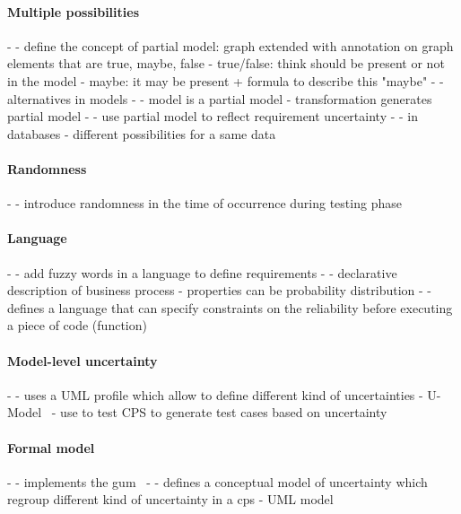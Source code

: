 \paragraph{Multiple possibilities}
- \cite{DBLP:conf/icse/FamelisSC12}
	- define the concept of partial model: graph extended with annotation on graph elements that are true, maybe, false
		- true/false: think should be present or not in the model
		- maybe: it may be present + formula to describe this "maybe"
- \cite{DBLP:journals/sosym/FamelisC19}
	- alternatives in models
- \cite{DBLP:conf/sle/EramoPR15, DBLP:conf/icse/EramoPR14}
	- model is a partial model
	- transformation generates partial model
- \cite{DBLP:journals/re/SalayCHS13}
	- use partial model to reflect requirement uncertainty
- \cite{DBLP:conf/vldb/BenjellounSHW06}	
	- in databases
	- different possibilities for a same data
	
\paragraph{Randomness}
- \cite{DBLP:conf/icst/Garousi08}
	- introduce randomness in the time of occurrence during testing phase
	
\paragraph{Language}
- \cite{DBLP:journals/re/WhittleSBCB10, DBLP:conf/re/WhittleSBCB09}
	- add fuzzy words in a language to define requirements 
- \cite{DBLP:journals/infsof/Jimenez-RamirezW0V15}
	- declarative description of business process
	- properties can be probability distribution
- \cite{DBLP:conf/oopsla/CarbinMR13}
	- defines a language that can specify constraints on the reliability before executing a piece of code (function)
	
\paragraph{Model-level uncertainty}
- \cite{DBLP:journals/sosym/Zhang00NO19}
	- uses a UML profile which allow to define different kind of uncertainties
	- U-Model~\cite{DBLP:conf/ecmdafa/ZhangSAYON16}
	- use to test CPS to generate test cases based on uncertainty
	
\paragraph{Formal model}
- \cite{DBLP:journals/csi/Hall06}
	- implements the \gls{gum}~\cite{metrology2008evaluation}
- \cite{DBLP:conf/ecmdafa/ZhangSAYON16}
	- defines a conceptual model of uncertainty which regroup different kind of uncertainty in a \gls{cps}
	- UML model
